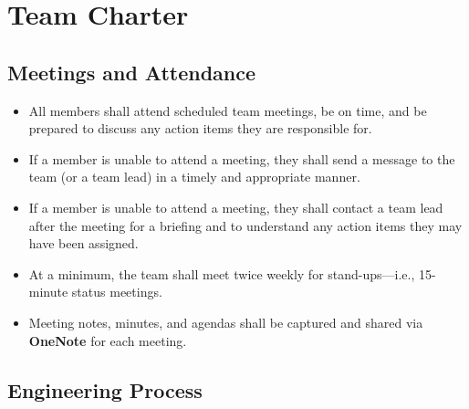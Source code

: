\chapter{Team Charter}\label{cp:team_charter}

\section{Meetings and Attendance}

\begin{itemize}
    \item All members shall attend scheduled team meetings, be on time, and be prepared to discuss any action items they are responsible for.
    \item If a member is unable to attend a meeting, they shall send a message to the team (or a team lead) in a timely and appropriate manner.
    \item If a member is unable to attend a meeting, they shall contact a team lead after the meeting for a briefing and to understand any action items they may have been assigned.
    \item At a minimum, the team shall meet twice weekly for stand-ups—i.e., 15-minute status meetings.
    \item Meeting notes, minutes, and agendas shall be captured and shared via \textbf{OneNote} for each meeting.
\end{itemize}

\section {Engineering Process}

